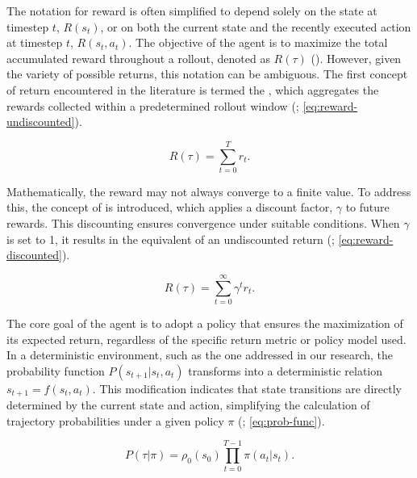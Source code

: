     \noindent The notation for reward is often simplified to depend solely on the state at timestep $t$, $R(s_t)$, or on both the current state and the recently executed action at timestep $t$, $R(s_t, a_t)$. The objective of the agent is to maximize the total accumulated reward throughout a rollout, denoted as $R(\tau)$ (\textcolor{deepblue}{\cite{Sutton1998}}). However, given the variety of possible returns, this notation can be ambiguous. The first concept of return encountered in the literature is termed the , which aggregates the rewards collected within a predetermined rollout window (\textcolor{deepblue}{\cite{Sutton1998}; \autoref{eq:reward-undiscounted}}).
    
    \begin{equation}
        R(\tau) = \sum_{t=0}^{T} r_t.
        \label{eq:reward-undiscounted}
    \end{equation}
    
    \noindent  Mathematically, the reward may not always converge to a finite value. To address this, the concept of  is introduced, which applies a discount factor, $\gamma$ to future rewards. This discounting ensures convergence under suitable conditions. When $\gamma$ is set to 1, it results in the equivalent of an undiscounted return (\textcolor{deepblue}{\cite{Sutton1998}; \autoref{eq:reward-discounted}}).
    
    \begin{equation}
        R(\tau) = \sum_{t=0}^{\infty} \gamma^{t}r_t.
        \label{eq:reward-discounted}
    \end{equation}
    
    \noindent The core goal of the agent is to adopt a policy that ensures the maximization of its expected return, regardless of the specific return metric or policy model used. In a deterministic environment, such as the one addressed in our research, the probability function $P(s_{t+1} | s_t, a_t)$ transforms into a deterministic relation $s_{t+1} = f(s_t, a_t)$. This modification indicates that state transitions are directly determined by the current state and action, simplifying the calculation of trajectory probabilities under a given policy $\pi$ (\textcolor{deepblue}{\cite{Sutton1998}; \autoref{eq:prob-func}}).
    
    \begin{equation}
        P(\tau | \pi) = \rho_0(s_0)\prod_{t=0}^{T-1} \pi(a_t|s_t).
        \label{eq:prob-func}
    \end{equation}
    
